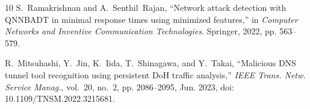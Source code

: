 \documentclass[conference]{IEEEtran}
\begin{document}
\begin{thebibliography}{10}
S.~Ramakrishnan and A.~Senthil~Rajan, ``Network attack detection with QNNBADT in minimal response times using minimized features,'' in \emph{Computer Networks and Inventive Communication Technologies}. Springer, 2022, pp. 563--579.

R.~Mitsuhashi, Y.~Jin, K.~Iida, T.~Shinagawa, and Y.~Takai, ``Malicious DNS tunnel tool recognition using persistent DoH traffic analysis,'' \emph{IEEE Trans. Netw. Service Manag.}, vol.~20, no.~2, pp. 2086--2095, Jun. 2023, doi: 10.1109/TNSM.2022.3215681.

\end{thebibliography}
\end{document}
